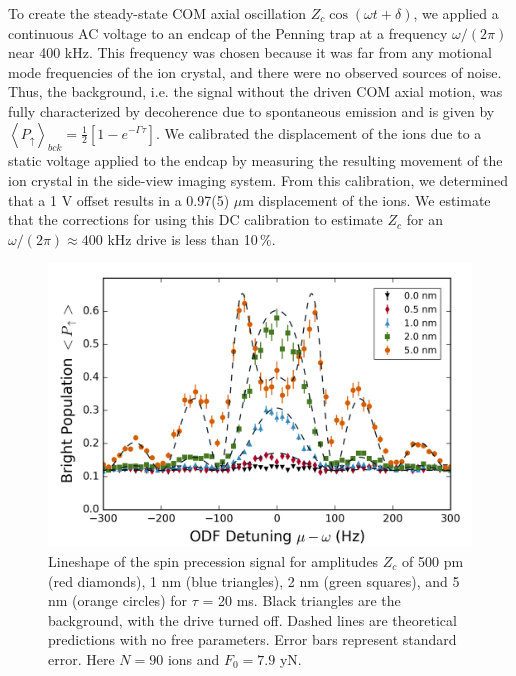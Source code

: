 \documentclass[aps,prl,twocolumn,superscriptaddress,floatfix]{revtex4-1}
\begin{document}
To create the steady-state COM axial oscillation $Z_c \cos(\omega t+\delta)$, we applied a continuous AC voltage to an endcap of the Penning trap at a frequency $\omega/(2\pi)$ near 400 kHz. This frequency was chosen because it was far from any motional mode frequencies of the ion crystal, and there were no observed sources of noise. Thus, the background, i.e. the signal without the driven COM axial motion, was fully characterized by decoherence due to spontaneous emission and is given by $\left\langle P_{\uparrow}\right\rangle _{bck}= \frac{1}{2}\left[1-e^{-\Gamma\tau}\right]$. We calibrated the displacement of the ions due to a static voltage applied to the endcap by measuring the resulting movement of the ion crystal in the side-view imaging system. From this calibration, we determined that a 1 V offset results in a 0.97(5) $\mu$m displacement of the ions. We estimate that the corrections for using this DC calibration to estimate $Z_c$ for an $\omega/(2\pi) \approx 400$ kHz drive is less than 10$\,\%$.

\begin{figure}
    \centering
    \includegraphics[width=\columnwidth]{lineshape}
  \caption{Lineshape of the spin precession signal for amplitudes $Z_c$ of 500 pm (red diamonds), 1 nm (blue triangles), 2 nm (green squares), and 5 nm (orange circles) for $\tau$ = 20 ms. Black triangles are the background, with the drive turned off. Dashed lines are theoretical predictions with no free parameters. Error bars represent standard error. Here $N = 90$ ions and $F_{0} = 7.9$ yN.}\label{lineshape}
\end{figure}
\end{document}
